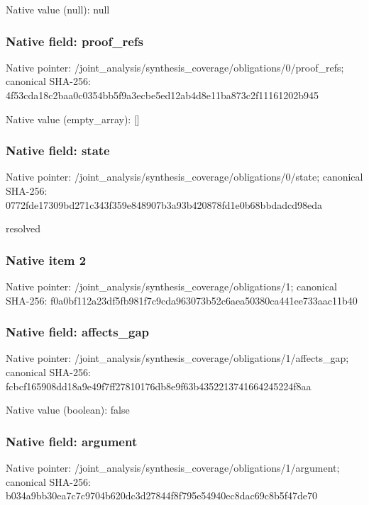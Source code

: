 \documentclass[10pt,a4paper]{article}
\begin{document}
Native value (null): null

\subsubsection{Native field: proof\_\allowbreak{}refs}
Native pointer: /joint\_\allowbreak{}analysis/synthesis\_\allowbreak{}coverage/obligations/0/proof\_\allowbreak{}refs; canonical SHA-256: 4f53cda18c2baa0c0354bb5f9a3ecbe5ed12ab4d8e11ba873c2f11161202b945

Native value (empty\_\allowbreak{}array): []

\subsubsection{Native field: state}
Native pointer: /joint\_\allowbreak{}analysis/synthesis\_\allowbreak{}coverage/obligations/0/state; canonical SHA-256: 0772fde17309bd271c343f359e848907b3a93b420878fd1e0b68bbdadcd98eda

\begingroup\raggedright\sloppy resolved\par\endgroup

\subsubsection{Native item 2}
Native pointer: /joint\_\allowbreak{}analysis/synthesis\_\allowbreak{}coverage/obligations/1; canonical SHA-256: f0a0bf112a23df5fb981f7c9cda963073b52c6aea50380ca441ee733aac11b40

\subsubsection{Native field: affects\_\allowbreak{}gap}
Native pointer: /joint\_\allowbreak{}analysis/synthesis\_\allowbreak{}coverage/obligations/1/affects\_\allowbreak{}gap; canonical SHA-256: fcbcf165908dd18a9e49f7ff27810176db8e9f63b4352213741664245224f8aa

Native value (boolean): false

\subsubsection{Native field: argument}
Native pointer: /joint\_\allowbreak{}analysis/synthesis\_\allowbreak{}coverage/obligations/1/argument; canonical SHA-256: b034a9bb30ea7c7c9704b620dc3d27844f8f795e54940ec8dac69c8b5f47de70
\end{document}
